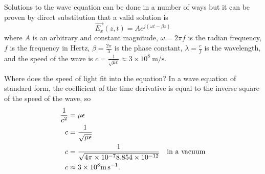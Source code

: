 \documentclass{tufte-handout}
\begin{document}
Solutions to the wave equation can be done in a number of ways but it can be proven by direct substitution 
that a valid solution is 
\begin{equation}
\vec{E_x}(z,t) = Ae^{j\left(\omega{}t-\beta{}z\right)}
\end{equation}
where $A$ is an arbitrary and constant magnitude, $\omega = 2\pi{}f$ is the radian frequency, $f$ is the frequency in Hertz, $\beta=\frac{2\pi}{\lambda}$ is the phase constant, $\lambda=\frac{c}{f}$ is the wavelength, and the speed of the wave is $c=\frac{1}{\sqrt{\mu\epsilon}}\approx 3\times10^8\SI{}{\metre\per\second}$.  

Where does the speed of light fit into the equation? In a wave equation of standard form, the coefficient of the time derivative is equal to the inverse square of the speed of the wave, so 
\begin{align}
\frac{1}{c^2} & = \mu\epsilon \\
c &= \frac{1}{\sqrt{\mu\epsilon}}\\
 c &= \frac{1}{\sqrt{4\pi\times 10^{-7}8.854\times 10^{-12}}} \text{\quad in a vacuum}\\
c  &\approx 3\times10^8 \SI{}{\meter\per\second}.
\end{align}
\end{document}
